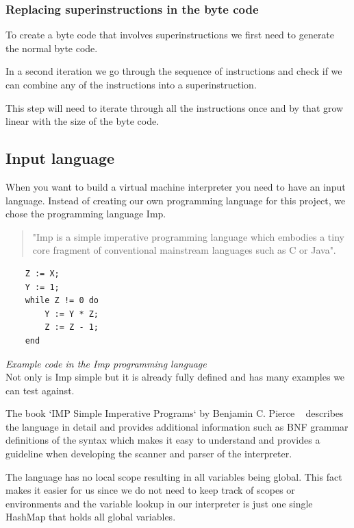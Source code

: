 \documentclass{article}
\begin{document}
\subsubsection{Replacing superinstructions in the byte code}
\label{sec:replacing_superinstructions}
To create a byte code that involves superinstructions we first need to generate
the normal byte code.

In a second iteration we go through the sequence of instructions and check
if we can combine any of the instructions into a superinstruction.

This step will need to iterate through all the instructions once and by that
grow linear with the size of the byte code.

\subsection{Input language} %
\label{sec:input_language}
When you want to build a virtual machine interpreter you need to have an
input language. Instead of creating our own programming language for this
project, we chose the programming language Imp. ~\cite{Pierce:SF1}

\begin{quotation}
"Imp is a simple imperative programming language which embodies a tiny core
fragment of conventional mainstream languages such as C or Java". ~\cite{Pierce:SF1}
\end{quotation}

\begin{verbatim}
    Z := X;
    Y := 1;
    while Z != 0 do
        Y := Y * Z;
        Z := Z - 1;
    end
\end{verbatim}
\textit{Example code in the Imp programming language} \\

Not only is Imp simple but it is already fully defined and has many examples
we can test against.

The book `IMP Simple Imperative Programs` by Benjamin C. Pierce
~\cite{Pierce:SF1} describes the language in detail and provides additional
information such as BNF grammar definitions of the syntax which makes it easy
to understand and provides a guideline when developing the scanner and parser
of the interpreter.

The language has no local scope resulting in all variables being global. This
fact makes it easier for us since we do not need to keep track of scopes or
environments and the variable lookup in our interpreter is just one single
HashMap that holds all global variables.
\end{document}
